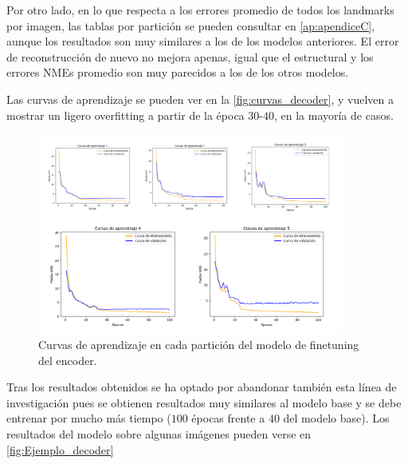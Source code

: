        \medskip

        \noindent Por otro lado, en lo que respecta a los errores promedio de todos los landmarks por imagen, las tablas por partición se pueden consultar en \autoref{ap:apendiceC}, aunque los resultados son muy similares a los de los modelos anteriores. El error de reconstrucción de nuevo no mejora apenas, igual que el estructural y los errores NMEs promedio son muy parecidos a los de los otros modelos. 

        \medskip

        \noindent Las curvas de aprendizaje se pueden ver en la \autoref{fig:curvas_decoder}, y vuelven a mostrar un ligero overfitting a partir de la época $30$-$40$, en la mayoría de casos. 
        
        \begin{figure}[!h]
            \centering
            \includegraphics[width=0.9\textwidth]{img/curvas_decoder.png}
            \caption{Curvas de aprendizaje en cada partición del modelo de finetuning del encoder.}
            \label{fig:curvas_decoder}
        \end{figure}

        \medskip

        \noindent Tras los resultados obtenidos se ha optado por abandonar también esta línea de investigación pues se obtienen resultados muy similares al modelo base y se debe entrenar por mucho más tiempo ($100$ épocas frente a $40$ del modelo base). Los resultados del modelo sobre algunas imágenes pueden verse en \autoref{fig:Ejemplo_decoder}

